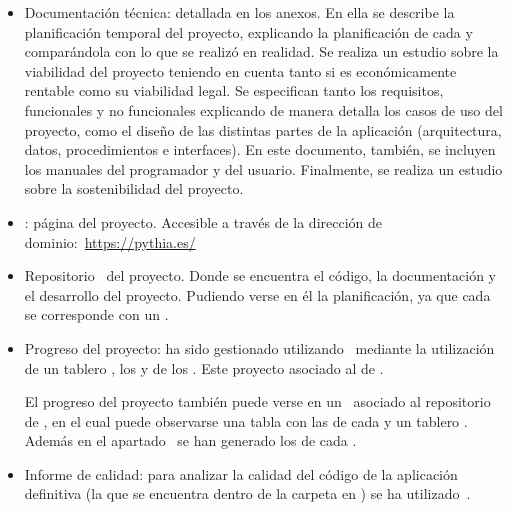 \begin{itemize}
\tightlist
	\item Documentación técnica: detallada en los anexos. En ella se describe la planificación temporal del proyecto, explicando la planificación de cada  y comparándola con lo que se realizó en realidad. Se realiza un estudio sobre la viabilidad del proyecto teniendo en cuenta tanto si es económicamente rentable como su viabilidad legal. Se especifican tanto los requisitos, funcionales y no funcionales explicando de manera detalla los casos de uso del proyecto, como el diseño de las distintas partes de la aplicación (arquitectura, datos, procedimientos e interfaces). En este documento, también, se incluyen los manuales del programador y del usuario. Finalmente, se realiza un estudio sobre la sostenibilidad del proyecto.
	\item {}: página  del proyecto. Accesible a través de la dirección de dominio:~\url{https://pythia.es/}
	\item Repositorio~\href{https://github.com/lbr1014/TFG_RAG.git}{} del proyecto. Donde se encuentra el código, la documentación y el desarrollo del proyecto. Pudiendo verse en él la planificación, ya que cada  se corresponde con un .
		\item Progreso del proyecto: ha sido gestionado utilizando~\href{https://app.zenhub.com/workspaces/tfgrag-68d94a186434450034791a44/board}{} mediante la utilización de un tablero , los  y de los . Este proyecto asociado al de .
		
		El progreso del proyecto también puede verse en un~\href{https://github.com/users/lbr1014/projects/1}{} asociado al repositorio de , en el cual puede observarse una tabla con las  de cada  y un tablero . Además en el apartado~\href{https://github.com/users/lbr1014/projects/1/insights}{} se han generado los  de cada .
		\item Informe de calidad: para analizar la calidad del código de la aplicación definitiva (la que se encuentra dentro de la carpeta  en ) se ha utilizado~\href{https://sonarcloud.io/project/overview?id=lbr1014_TFG_RAG}{}.
\end{itemize}